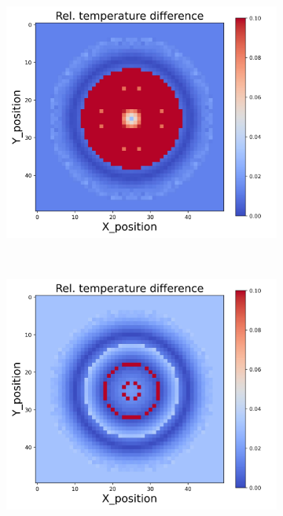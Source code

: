 \begin{figure}[h]
\begin{minipage}{\textwidth}
\begin{subfigure}{0.3\textwidth}
        \end{subfigure}
        \begin{subfigure}{0.3\textwidth}
            \centering
            \includegraphics[width=\textwidth]{figures/raw_data/24/linear/T_bias.jpg}
        \end{subfigure}
    \end{minipage}\\
    \begin{minipage}{\textwidth}
        \centering
        \begin{subfigure}{0.3\textwidth}
            \centering
            \includegraphics[width=\textwidth]{figures/raw_data/25/linear/T_bias.jpg}

\end{subfigure}
\end{minipage}
\end{figure}
